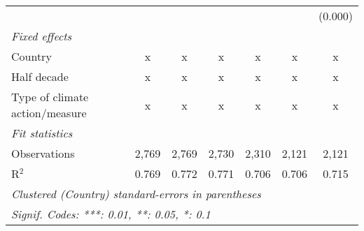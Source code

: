 \begin{tabular}{lcccccc}
                                                            &         &         &              &                &                & (0.000)\\   
   \emph{Fixed effects}\\
   Country                                                  & x       & x       & x            & x              & x              & x\\  
   Half decade                                              & x       & x       & x            & x              & x              & x\\  
   Type of climate action/measure                           & x       & x       & x            & x              & x              & x\\  
   \midrule \emph{Fit statistics}\\
   Observations                                             & 2,769   & 2,769   & 2,730        & 2,310          & 2,121          & 2,121\\  
   R$^2$                                                    & 0.769   & 0.772   & 0.771        & 0.706          & 0.706          & 0.715\\  
   \midrule
   \multicolumn{7}{l}{\emph{Clustered (Country) standard-errors in parentheses}}\\
   \multicolumn{7}{l}{\emph{Signif. Codes: ***: 0.01, **: 0.05, *: 0.1}}\\
\end{tabular}
\par\endgroup


